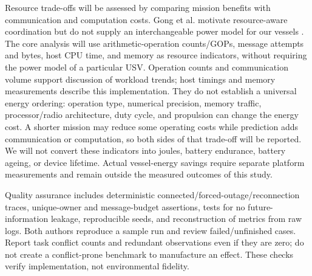 Resource trade-offs will be assessed by comparing mission benefits with communication and computation costs. Gong et al. motivate resource-aware coordination but do not supply an interchangeable power model for our vessels \cite{gong2022resource}. The core analysis will use arithmetic-operation counts/GOPs, message attempts and bytes, host CPU time, and memory as resource indicators, without requiring the power model of a particular USV. Operation counts and communication volume support discussion of workload trends; host timings and memory measurements describe this implementation. They do not establish a universal energy ordering: operation type, numerical precision, memory traffic, processor/radio architecture, duty cycle, and propulsion can change the energy cost. A shorter mission may reduce some operating costs while prediction adds communication or computation, so both sides of that trade-off will be reported. We will not convert these indicators into joules, battery endurance, battery ageing, or device lifetime. Actual vessel-energy savings require separate platform measurements and remain outside the measured outcomes of this study.

Quality assurance includes deterministic connected/forced-outage/reconnection traces, unique-owner and message-budget assertions, tests for no future-information leakage, reproducible seeds, and reconstruction of metrics from raw logs. Both authors reproduce a sample run and review failed/unfinished cases. Report task conflict counts and redundant observations even if they are zero; do not create a conflict-prone benchmark to manufacture an effect. These checks verify implementation, not environmental fidelity.
